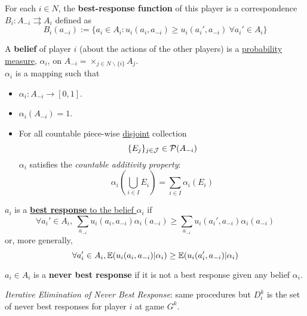 \documentclass[11pt]{article}
\begin{document}
			\begin{definition}
				For each $i \in N$, the \textbf{best-response function} of this player is a correspondence $B_i: A_{-i} \rightrightarrows A_i$ defined as
				\begin{equation}
					B_i(a_{-i}) := \{a_i \in A_i : u_i(a_i, a_{-i}) \geq u_i(a_i', a_{-i})\ \forall a_i' \in A_i \}
				\end{equation}
			\end{definition}
			
			\begin{definition}
				A \textbf{belief} of player $i$ (about the actions of the other players) is a \ul{probability measure}, $\alpha_i$, on $A_{-i}=\times_{j \in N \backslash \{i\}} A_j$. \\
				$\alpha_i$ is a mapping such that
				\begin{itemize}
					\item $\alpha_i: A_{-i} \to [0,1]$.
					\item $\alpha_i(A_{-i}) = 1$.
					\item For all countable piece-wise \ul{disjoint} collection 
					\[
						\{E_j\}_{j\in \mathcal{{J}}} \in \mathcal{{P}}(A_{-i})
					\]
					$\alpha_i$ satisfies the \emph{countable additivity property}:
					\[
						\alpha_i(\bigcup_{i \in I} E_i) = \sum_{i \in I}\alpha_i(E_i)
					\]
				\end{itemize}
			\end{definition}
				
			\begin{definition}
				$a_i$ is a \ul{\textbf{best response} to the belief $\alpha_i$} if
				\begin{equation}
					\forall a_i' \in A_i,\ \sum_{a_{-i}} u_i(a_i, a_{-i}) \alpha_i(a_{-i}) \geq \sum_{a_{-i}} u_i(a_i', a_{-i}) \alpha_i(a_{-i})
				\end{equation}
				or, more generally,
				\begin{equation}
					\forall a'_i \in A_i, \mathbb{E}({u_i(a_i, a_{-i})|\alpha_i}) \geq \mathbb{E}({u_i(a_i', a_{-i})|\alpha_i})
				\end{equation}
			\end{definition}
			
			\begin{definition}
				$a_i \in A_i$ is a \textbf{never best response} if it is not a best response given any belief $\alpha_i$.
			\end{definition}
			
			\begin{corollary}
				\emph{Iterative Elimination of Never Best Response}: same procedures but $D_i^k$ is the set of never best responses for player $i$ at game $G^k$.
			\end{corollary}
			
\end{document}

